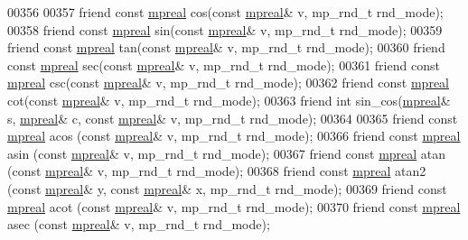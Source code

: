 \begin{DoxyCode}
00356 
00357     \textcolor{keyword}{friend} \textcolor{keyword}{const} \hyperlink{classmpfr_1_1mpreal}{mpreal} cos(\textcolor{keyword}{const} \hyperlink{classmpfr_1_1mpreal}{mpreal}& v, mp\_rnd\_t rnd\_mode);
00358     \textcolor{keyword}{friend} \textcolor{keyword}{const} \hyperlink{classmpfr_1_1mpreal}{mpreal} sin(\textcolor{keyword}{const} \hyperlink{classmpfr_1_1mpreal}{mpreal}& v, mp\_rnd\_t rnd\_mode);
00359     \textcolor{keyword}{friend} \textcolor{keyword}{const} \hyperlink{classmpfr_1_1mpreal}{mpreal} tan(\textcolor{keyword}{const} \hyperlink{classmpfr_1_1mpreal}{mpreal}& v, mp\_rnd\_t rnd\_mode);
00360     \textcolor{keyword}{friend} \textcolor{keyword}{const} \hyperlink{classmpfr_1_1mpreal}{mpreal} sec(\textcolor{keyword}{const} \hyperlink{classmpfr_1_1mpreal}{mpreal}& v, mp\_rnd\_t rnd\_mode);
00361     \textcolor{keyword}{friend} \textcolor{keyword}{const} \hyperlink{classmpfr_1_1mpreal}{mpreal} csc(\textcolor{keyword}{const} \hyperlink{classmpfr_1_1mpreal}{mpreal}& v, mp\_rnd\_t rnd\_mode);
00362     \textcolor{keyword}{friend} \textcolor{keyword}{const} \hyperlink{classmpfr_1_1mpreal}{mpreal} cot(\textcolor{keyword}{const} \hyperlink{classmpfr_1_1mpreal}{mpreal}& v, mp\_rnd\_t rnd\_mode);
00363     \textcolor{keyword}{friend} \textcolor{keywordtype}{int} sin\_cos(\hyperlink{classmpfr_1_1mpreal}{mpreal}& s, \hyperlink{classmpfr_1_1mpreal}{mpreal}& c, \textcolor{keyword}{const} \hyperlink{classmpfr_1_1mpreal}{mpreal}& v, mp\_rnd\_t rnd\_mode);
00364 
00365     \textcolor{keyword}{friend} \textcolor{keyword}{const} \hyperlink{classmpfr_1_1mpreal}{mpreal} acos  (\textcolor{keyword}{const} \hyperlink{classmpfr_1_1mpreal}{mpreal}& v, mp\_rnd\_t rnd\_mode);
00366     \textcolor{keyword}{friend} \textcolor{keyword}{const} \hyperlink{classmpfr_1_1mpreal}{mpreal} asin  (\textcolor{keyword}{const} \hyperlink{classmpfr_1_1mpreal}{mpreal}& v, mp\_rnd\_t rnd\_mode);
00367     \textcolor{keyword}{friend} \textcolor{keyword}{const} \hyperlink{classmpfr_1_1mpreal}{mpreal} atan  (\textcolor{keyword}{const} \hyperlink{classmpfr_1_1mpreal}{mpreal}& v, mp\_rnd\_t rnd\_mode);
00368     \textcolor{keyword}{friend} \textcolor{keyword}{const} \hyperlink{classmpfr_1_1mpreal}{mpreal} atan2 (\textcolor{keyword}{const} \hyperlink{classmpfr_1_1mpreal}{mpreal}& y, \textcolor{keyword}{const} \hyperlink{classmpfr_1_1mpreal}{mpreal}& x, mp\_rnd\_t rnd\_mode);
00369     \textcolor{keyword}{friend} \textcolor{keyword}{const} \hyperlink{classmpfr_1_1mpreal}{mpreal} acot  (\textcolor{keyword}{const} \hyperlink{classmpfr_1_1mpreal}{mpreal}& v, mp\_rnd\_t rnd\_mode);
00370     \textcolor{keyword}{friend} \textcolor{keyword}{const} \hyperlink{classmpfr_1_1mpreal}{mpreal} asec  (\textcolor{keyword}{const} \hyperlink{classmpfr_1_1mpreal}{mpreal}& v, mp\_rnd\_t rnd\_mode);

\end{DoxyCode}
